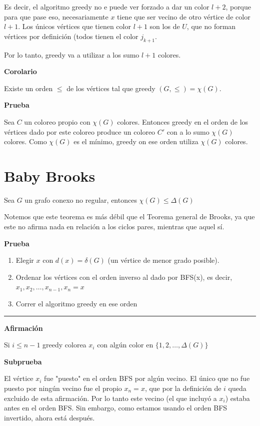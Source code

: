 \documentclass[10pt,a4paper]{article}
\begin{document}
Es decir, el algoritmo greedy no e puede ver forzado a dar un color $l + 2$, porque para que pase eso, necesariamente $x$ tiene que ser vecino de otro vértice de color $l + 1$. Los únicos vértices que tienen color $l + 1$ son los de $U$, que no forman vértices por definición (todos tienen el color $j_{k+1}$.

Por lo tanto, greedy va a utilizar a los sumo $l + 1$ colores.

\textbf{Corolario}

Existe un orden $\leq$ de los vértices tal que greedy $(G, \leq) = \chi(G)$.

\textbf{Prueba}

Sea $C$ un coloreo propio con $\chi(G)$ colores. Entonces greedy en el orden de los vértices dado por este coloreo produce un coloreo $C'$ con a lo sumo $\chi(G)$ colores. Como $\chi(G)$ es el mínimo, greedy on ese orden utiliza $\chi(G)$ colores.

\section*{Baby Brooks}

Sea $G$ un grafo conexo no regular, entonces $\chi(G) \leq \Delta(G)$

Notemos que este teorema es más débil que el Teorema general de Brooks, ya que este no afirma nada en relación a los ciclos pares, mientras que aquel sí.

\textbf{Prueba}

\begin{enumerate}

	\item Elegir $x$ con $d(x) = \delta(G)$ (un vértice de menor grado posible).
	\item Ordenar los vértices con el orden inverso al dado por BFS(x), es decir, $x_1, x_2, \dots, x_{n-1}, x_n = x$
	\item Correr el algoritmo greedy en ese orden
\end{enumerate}

\vspace{0.5cm}\hrule\vspace{0.5cm}
\textbf{Afirmación}

Si $i\leq n-1$ greedy colorea $x_i$ con algún color en $\{1, 2, \dots, \Delta(G)\}$

\textbf{Subprueba}

El vértice $x_i$ fue "puesto" en el orden BFS por algún vecino. El único que no fue puesto por ningún vecino fue el propio $x_n = x$, que por la definición de $i$ queda excluido de esta afirmación. Por lo tanto este vecino (el que incluyó a $x_i$) estaba antes en el orden BFS. Sin embargo, como estamos usando el orden BFS invertido, ahora está después.
\end{document}

